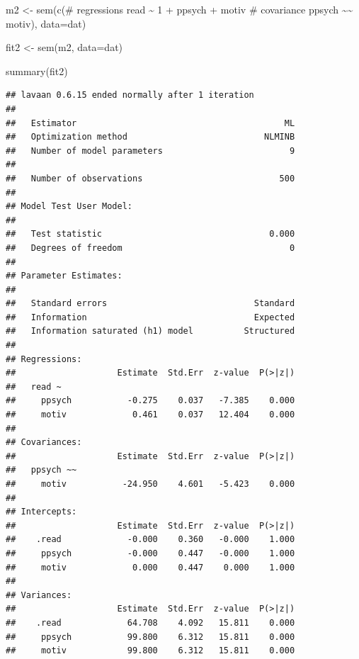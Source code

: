 \documentclass[
]{article}
\newenvironment{Shaded}{\begin{snugshade}}{\end{snugshade}}
\newcommand{\AttributeTok}[1]{\textcolor[rgb]{0.77,0.63,0.00}{#1}}
\newcommand{\FunctionTok}[1]{\textcolor[rgb]{0.00,0.00,0.00}{#1}}
\newcommand{\NormalTok}[1]{#1}
\newcommand{\OtherTok}[1]{\textcolor[rgb]{0.56,0.35,0.01}{#1}}
\newcommand{\StringTok}[1]{\textcolor[rgb]{0.31,0.60,0.02}{#1}}
\begin{document}
\begin{Shaded}
\begin{Highlighting}[]
\NormalTok{m2 }\OtherTok{\textless{}{-}} \FunctionTok{sem}\NormalTok{(}\FunctionTok{c}\NormalTok{(}\StringTok{\textquotesingle{}\# regressions}
\StringTok{                read \textasciitilde{} 1 + ppsych + motiv}
\StringTok{                \# covariance}
\StringTok{                ppsych \textasciitilde{}\textasciitilde{} motiv\textquotesingle{}}\NormalTok{), }
             \AttributeTok{data=}\NormalTok{dat)}

\NormalTok{fit2 }\OtherTok{\textless{}{-}} \FunctionTok{sem}\NormalTok{(m2, }\AttributeTok{data=}\NormalTok{dat)}

\FunctionTok{summary}\NormalTok{(fit2)}
\end{Highlighting}
\end{Shaded}

\begin{verbatim}
## lavaan 0.6.15 ended normally after 1 iteration
## 
##   Estimator                                         ML
##   Optimization method                           NLMINB
##   Number of model parameters                         9
## 
##   Number of observations                           500
## 
## Model Test User Model:
##                                                       
##   Test statistic                                 0.000
##   Degrees of freedom                                 0
## 
## Parameter Estimates:
## 
##   Standard errors                             Standard
##   Information                                 Expected
##   Information saturated (h1) model          Structured
## 
## Regressions:
##                    Estimate  Std.Err  z-value  P(>|z|)
##   read ~                                              
##     ppsych           -0.275    0.037   -7.385    0.000
##     motiv             0.461    0.037   12.404    0.000
## 
## Covariances:
##                    Estimate  Std.Err  z-value  P(>|z|)
##   ppsych ~~                                           
##     motiv           -24.950    4.601   -5.423    0.000
## 
## Intercepts:
##                    Estimate  Std.Err  z-value  P(>|z|)
##    .read             -0.000    0.360   -0.000    1.000
##     ppsych           -0.000    0.447   -0.000    1.000
##     motiv             0.000    0.447    0.000    1.000
## 
## Variances:
##                    Estimate  Std.Err  z-value  P(>|z|)
##    .read             64.708    4.092   15.811    0.000
##     ppsych           99.800    6.312   15.811    0.000
##     motiv            99.800    6.312   15.811    0.000
\end{verbatim}
\end{document}
